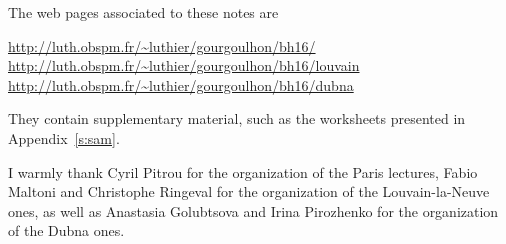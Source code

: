 The web pages associated to these notes are
\begin{center}
\url{http://luth.obspm.fr/~luthier/gourgoulhon/bh16/}\\
\url{http://luth.obspm.fr/~luthier/gourgoulhon/bh16/louvain}\\
\url{http://luth.obspm.fr/~luthier/gourgoulhon/bh16/dubna}
\end{center}
They contain supplementary material, such as the worksheets presented in
Appendix~\ref{s:sam}.

\vspace{2ex}

I warmly thank Cyril Pitrou for the organization of the Paris lectures,
Fabio Maltoni and Christophe Ringeval for the organization of the Louvain-la-Neuve ones,
as well as Anastasia Golubtsova and Irina Pirozhenko for the
organization of the Dubna ones.
